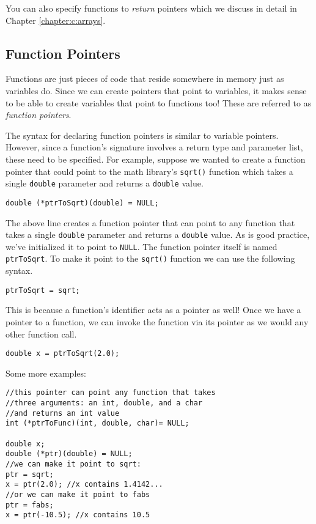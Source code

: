 You can also specify functions to \emph{return} pointers
which we discuss in detail in Chapter \ref{chapter:c:arrays}.

\subsection{Function Pointers}

Functions are just pieces of code that reside somewhere in 
memory just as variables do.  Since we can create pointers
that point to variables, it makes sense to be able to create
variables that point to functions too!  These are referred to
as \emph{function pointers}.  

The syntax for declaring function pointers is similar to variable
pointers.  However, since a function's signature involves a
return type and parameter list, these need to be specified.
For example, suppose we wanted to create a function pointer
that could point to the math library's \texttt{sqrt()} function
which takes a single \texttt{double} parameter and
returns a \texttt{double} value.  

\texttt{double (*ptrToSqrt)(double) = NULL;}

The above line creates a function pointer that can point to
any function that takes a single \texttt{double} parameter
and returns a \texttt{double} value.  As is good practice,
we've initialized it to point to \texttt{NULL}.  The function
pointer itself is named \texttt{ptrToSqrt}.  To make it
point to the \texttt{sqrt()} function we can use the following
syntax.

\texttt{ptrToSqrt = sqrt;}

This is because a function's identifier acts as a pointer as well!
Once we have a pointer to a function, we can invoke the function
via its pointer as we would any other function call.

\texttt{double x = ptrToSqrt(2.0);}

Some more examples:

\begin{verbatim}
//this pointer can point any function that takes
//three arguments: an int, double, and a char
//and returns an int value
int (*ptrToFunc)(int, double, char)= NULL;

double x;
double (*ptr)(double) = NULL;
//we can make it point to sqrt:
ptr = sqrt;
x = ptr(2.0); //x contains 1.4142...
//or we can make it point to fabs
ptr = fabs;
x = ptr(-10.5); //x contains 10.5
\end{verbatim}

